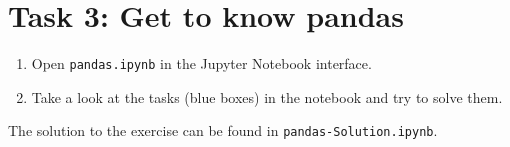 \documentclass[
english,
smallborders
]{i6prcsht}
\begin{document}
\section*{Task 3: Get to know pandas}

\begin{enumerate}
	\item Open \texttt{pandas.ipynb} in the Jupyter Notebook interface.
	\item Take a look at the tasks (blue boxes) in the notebook and try to solve them.
\end{enumerate}

\begin{solution}
	The solution to the exercise can be found in \texttt{pandas-Solution.ipynb}.
\end{solution}
\end{document}
